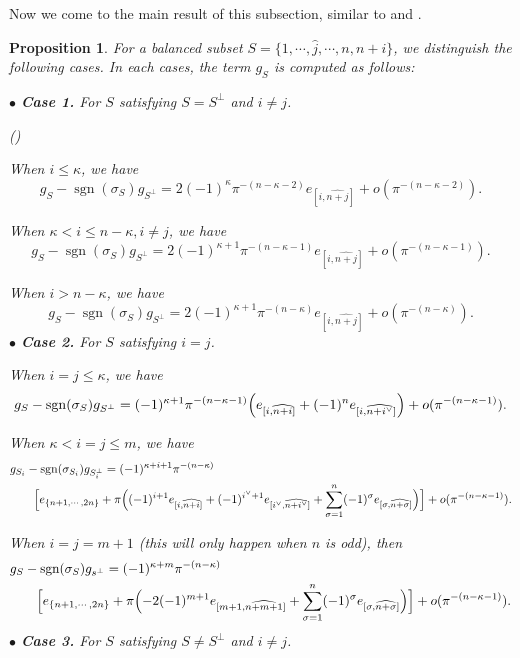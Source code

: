 \documentclass[pdflatex,sn-mathphys-num]{sn-jnl}%
\theoremstyle{thmstyleone}%
\newtheorem{proposition}[subsubsection]{Proposition}%
\theoremstyle{thmstyletwo}%
\numberwithin{equation}{subsection}
\theoremstyle{thmstylethree}%
\DeclareMathOperator{\sgn}{sgn}
\newcommand{\wh}{\widehat}
\newenvironment{altenumerate}
	{\begin{list}
			{(\theenumi) }
			{\usecounter{enumi}
				\setlength{\labelwidth}{0pt}
				\setlength{\labelsep}{0pt}
				\setlength{\leftmargin}{0pt}
				\setlength{\itemsep}{\the\smallskipamount}
				\renewcommand{\theenumi}{\roman{enumi}}
		}}
		{\end{list}}
\begin{document}
		
Now we come to the main result of this subsection, similar to \cite[Lemma 4.10]{Smithling2015} and \cite[Lemma 2]{Yu2019}.
\begin{proposition}\label{equ_ss-comp:g_S-dual}
	For a balanced subset $S=\{1,\cdots,\hat{j},\cdots,n,n+i\}$, we distinguish the following cases. In each cases, the term $g_S$ is computed as follows:
	
\noindent$\bullet$ \textbf{Case 1.} For $S$ satisfying $S=S^\perp$ and $i\neq j$.
	\begin{altenumerate}
	\item When $i\leq \kappa$, we have
	\[
	g_S-\sgn(\sigma_S)g_{S^\perp}
	=2(-1)^\kappa \pi^{-(n-\kappa-2)} e_{[i,\wh{n+j}]}+o(\pi^{-(n-\kappa-2)}).
	\]
				
	\item When $\kappa<i\leq n-\kappa,i\neq j$, we have
	\[
	g_S-\sgn(\sigma_S)g_{S^\perp}
	=2(-1)^{\kappa+1} \pi^{-(n-\kappa-1)} e_{[i,\wh{n+j}]}+o(\pi^{-(n-\kappa-1)}).
	\]
				
	\item When $i>n-\kappa$, we have 
	\[
	g_S-\sgn(\sigma_S)g_{S^\perp}
	=2(-1)^{\kappa+1} \pi^{-(n-\kappa)} e_{[i,\wh{n+j}]}+o(\pi^{-(n-\kappa)}).
	\]
\noindent $\bullet$ \textbf{Case 2.} For $S$ satisfying $i=j$.
						
	\item When $i=j\leq \kappa$, we have
	\[
	g_S-\sgn(\sigma_S)g_{S^\perp}
	=(-1)^{\kappa+1}\pi^{-(n-\kappa-1)}
	\Bigl( e_{[i,\wh{n+i}]}
	+(-1)^n e_{[i,\wh{n+i^\vee}]}\Bigr)+o(\pi^{-(n-\kappa-1)}).
	\]
				
	\item When $\kappa<i=j\leq m$, we have
	\begin{align*}
		&g_{S_i}-\sgn(\sigma_{S_i})g_{S_i^\perp}=(-1)^{\kappa+i+1}\pi^{-(n-\kappa)}\\
		&\qquad\Bigl[e_{\{n+1,\cdots,2n\}}+\pi\Bigl(
		(-1)^{i+1} e_{[i,\wh{n+i}]}
		+(-1)^{i^\vee+1} e_{[i^\vee,\wh{n+i^\vee}]}
		+\sum_{\sigma=1}^n(-1)^\sigma  e_{[\sigma,\wh{n+\sigma}]}\Bigr)\Bigr]+o(\pi^{-(n-\kappa-1)}).
	\end{align*}
				
	\item When $i=j=m+1$ (this will only happen when $n$ is odd), then
	\begin{align*}
		&g_S-\sgn(\sigma_S)g_{s^\perp}=(-1)^{\kappa+m}\pi^{-(n-\kappa)}\\
		&\qquad\Bigl[e_{\{n+1,\cdots,2n\}}+\pi\Bigl(-2(-1)^{m+1}e_{[m+1,\wh{n+m+1}]}+
		\sum_{\sigma=1}^n (-1)^\sigma e_{[\sigma,\wh{n+\sigma}]}\Bigr)\Bigr]+o(\pi^{-(n-\kappa-1)}).
	\end{align*}
\noindent$\bullet$ \textbf{Case 3.} For $S$ satisfying $S \neq S^\perp$ and $i\neq j$.
				

\end{altenumerate}
\end{proposition}
\end{document}
